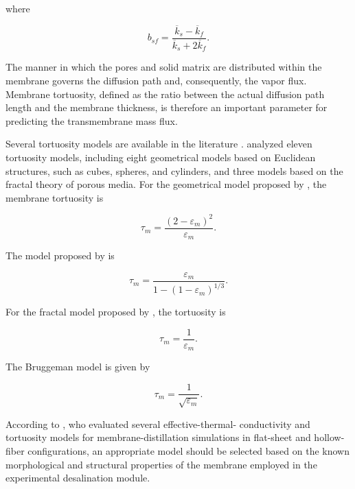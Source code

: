 \documentclass[14pt,letterpaper,fleqn]{extarticle}
\begin{document}
where

\begin{equation}
b_{sf}
=
\frac{
\overline{k}_s-\overline{k}_f
}{
\overline{k}_s+2\overline{k}_f
}.
\label{eq:maxwell-conductivity-ratio}
\end{equation}

The manner in which the pores and solid matrix are distributed within the
membrane governs the diffusion path and, consequently, the vapor flux.
Membrane tortuosity, defined as the ratio between the actual diffusion path
length and the membrane thickness, is therefore an important parameter for
predicting the transmembrane mass flux.

Several tortuosity models are available in the literature
\citep{Ghanbarian2013}. \citet{Kim2021} analyzed eleven tortuosity models,
including eight geometrical models based on Euclidean structures, such as
cubes, spheres, and cylinders, and three models based on the fractal theory of
porous media. For the geometrical model proposed by \citet{MackieMeares1955}, the membrane
tortuosity is

\begin{equation}
\tau_m
=
\frac{
\left(
2-\varepsilon_m
\right)^2
}{
\varepsilon_m
}.
\label{eq:tortuosity-mackie-meares}
\end{equation}

The model proposed by \citet{Beeckman1990} is

\begin{equation}
\tau_m
=
\frac{
\varepsilon_m
}{
1-
\left(
1-\varepsilon_m
\right)^{1/3}
}.
\label{eq:tortuosity-beeckman}
\end{equation}

For the fractal model proposed by \citet{EliasKohav1991}, the tortuosity is

\begin{equation}
\tau_m
=
\frac{1}{\varepsilon_m}.
\label{eq:tortuosity-elias-kohav}
\end{equation}

The Bruggeman model is given by

\begin{equation}
\tau_m
=
\frac{1}{\sqrt{\varepsilon_m}}.
\label{eq:tortuosity-bruggeman}
\end{equation}

According to \citep{Curcino2022}, who evaluated several effective-thermal-
conductivity and tortuosity models for membrane-distillation simulations in
flat-sheet and hollow-fiber configurations, an appropriate model should be
selected based on the known morphological and structural properties of the
membrane employed in the experimental desalination module.
\end{document}
